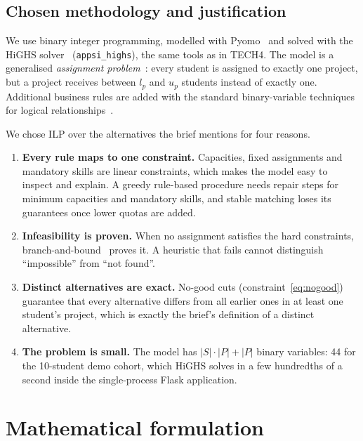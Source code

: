 \documentclass[11pt,a4paper]{article}
\newcommand{\code}[1]{\texttt{#1}}
\begin{document}
\subsection{Chosen methodology and justification}

We use binary integer programming, modelled with Pyomo~\cite{pyomo} and solved
with the HiGHS solver~\cite{highs} (\code{appsi\_highs}), the same tools as in
TECH4. The model is a generalised
\emph{assignment problem}~\cite[Ch.~9.3]{ior}: every student is assigned to
exactly one project, but a project receives between $l_p$ and $u_p$ students
instead of exactly one. Additional business rules are added with the standard
binary-variable techniques for logical relationships~\cite[Ch.~12]{ior}.

We chose ILP over the alternatives the brief mentions for four reasons.
\begin{enumerate}
  \item \textbf{Every rule maps to one constraint.} Capacities, fixed
        assignments and mandatory skills are linear constraints, which makes
        the model easy to inspect and explain. A greedy rule-based procedure
        needs repair steps for minimum capacities and mandatory skills, and
        stable matching loses its guarantees once lower quotas are added.
  \item \textbf{Infeasibility is proven.} When no assignment satisfies the
        hard constraints, branch-and-bound~\cite[Ch.~12.6]{ior} proves it. A
        heuristic that fails cannot distinguish ``impossible'' from ``not
        found''.
  \item \textbf{Distinct alternatives are exact.} No-good cuts
        (constraint~\eqref{eq:nogood}) guarantee that every alternative
        differs from all earlier ones in at least one student's project, which
        is exactly the brief's definition of a distinct alternative.
  \item \textbf{The problem is small.} The model has $|S|\cdot|P| + |P|$
        binary variables: 44 for the 10-student demo cohort, which HiGHS solves
        in a few hundredths of a second inside the single-process Flask
        application.
\end{enumerate}

\section{Mathematical formulation}
\end{document}
